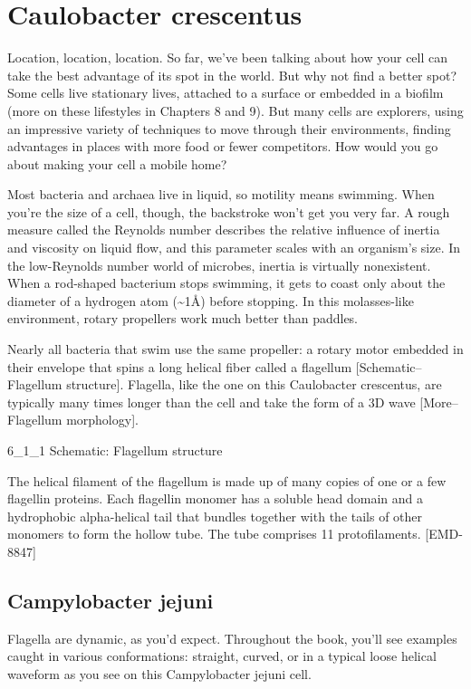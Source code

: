 \documentclass[]{tufte-book}
\begin{document}
\section{Caulobacter crescentus}\label{caulobacter-crescentus-6}

Location, location, location. So far, we've been talking about how your
cell can take the best advantage of its spot in the world. But why not
find a better spot? Some cells live stationary lives, attached to a
surface or embedded in a biofilm (more on these lifestyles in Chapters 8
and 9). But many cells are explorers, using an impressive variety of
techniques to move through their environments, finding advantages in
places with more food or fewer competitors. How would you go about
making your cell a mobile home?

Most bacteria and archaea live in liquid, so motility means swimming.
When you're the size of a cell, though, the backstroke won't get you
very far. A rough measure called the Reynolds number describes the
relative influence of inertia and viscosity on liquid flow, and this
parameter scales with an organism's size. In the low-Reynolds number
world of microbes, inertia is virtually nonexistent. When a rod-shaped
bacterium stops swimming, it gets to coast only about the diameter of a
hydrogen atom (\textasciitilde{}1Å) before stopping. In this
molasses-like environment, rotary propellers work much better than
paddles.

Nearly all bacteria that swim use the same propeller: a rotary motor
embedded in their envelope that spins a long helical fiber called a
flagellum {[}Schematic--Flagellum structure{]}. Flagella, like the one
on this Caulobacter crescentus, are typically many times longer than the
cell and take the form of a 3D wave {[}More--Flagellum morphology{]}.

6\_1\_1 Schematic: Flagellum structure

The helical filament of the flagellum is made up of many copies of one
or a few flagellin proteins. Each flagellin monomer has a soluble head
domain and a hydrophobic alpha-helical tail that bundles together with
the tails of other monomers to form the hollow tube. The tube comprises
11 protofilaments. {[}EMD-8847{]}

\subsection{Campylobacter jejuni}\label{Flagellum_morphology}

Flagella are dynamic, as you'd expect. Throughout the book, you'll see
examples caught in various conformations: straight, curved, or in a
typical loose helical waveform as you see on this Campylobacter jejuni
cell.
\end{document}
